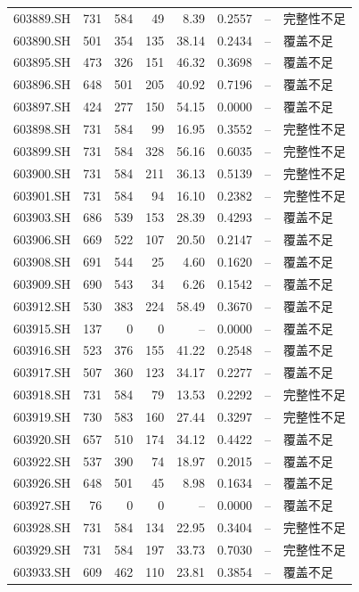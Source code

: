 \documentclass[10pt,a4paper]{article}
\begin{document}
\begin{longtable}{lrrr r r r l}
603889.SH & 731 & 584 & 49 & 8.39 & 0.2557 & -- & 完整性不足\\
603890.SH & 501 & 354 & 135 & 38.14 & 0.2434 & -- & 覆盖不足\\
603895.SH & 473 & 326 & 151 & 46.32 & 0.3698 & -- & 覆盖不足\\
603896.SH & 648 & 501 & 205 & 40.92 & 0.7196 & -- & 覆盖不足\\
603897.SH & 424 & 277 & 150 & 54.15 & 0.0000 & -- & 覆盖不足\\
603898.SH & 731 & 584 & 99 & 16.95 & 0.3552 & -- & 完整性不足\\
603899.SH & 731 & 584 & 328 & 56.16 & 0.6035 & -- & 完整性不足\\
603900.SH & 731 & 584 & 211 & 36.13 & 0.5139 & -- & 完整性不足\\
603901.SH & 731 & 584 & 94 & 16.10 & 0.2382 & -- & 完整性不足\\
603903.SH & 686 & 539 & 153 & 28.39 & 0.4293 & -- & 覆盖不足\\
603906.SH & 669 & 522 & 107 & 20.50 & 0.2147 & -- & 覆盖不足\\
603908.SH & 691 & 544 & 25 & 4.60 & 0.1620 & -- & 覆盖不足\\
603909.SH & 690 & 543 & 34 & 6.26 & 0.1542 & -- & 覆盖不足\\
603912.SH & 530 & 383 & 224 & 58.49 & 0.3670 & -- & 覆盖不足\\
603915.SH & 137 & 0 & 0 & -- & 0.0000 & -- & 覆盖不足\\
603916.SH & 523 & 376 & 155 & 41.22 & 0.2548 & -- & 覆盖不足\\
603917.SH & 507 & 360 & 123 & 34.17 & 0.2277 & -- & 覆盖不足\\
603918.SH & 731 & 584 & 79 & 13.53 & 0.2292 & -- & 完整性不足\\
603919.SH & 730 & 583 & 160 & 27.44 & 0.3297 & -- & 完整性不足\\
603920.SH & 657 & 510 & 174 & 34.12 & 0.4422 & -- & 覆盖不足\\
603922.SH & 537 & 390 & 74 & 18.97 & 0.2015 & -- & 覆盖不足\\
603926.SH & 648 & 501 & 45 & 8.98 & 0.1634 & -- & 覆盖不足\\
603927.SH & 76 & 0 & 0 & -- & 0.0000 & -- & 覆盖不足\\
603928.SH & 731 & 584 & 134 & 22.95 & 0.3404 & -- & 完整性不足\\
603929.SH & 731 & 584 & 197 & 33.73 & 0.7030 & -- & 完整性不足\\
603933.SH & 609 & 462 & 110 & 23.81 & 0.3854 & -- & 覆盖不足\\

\end{longtable}
\end{document}
